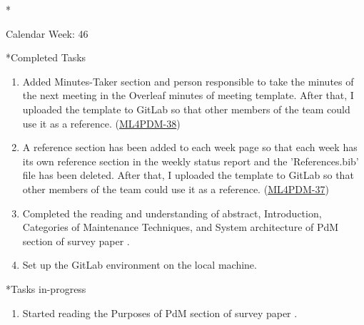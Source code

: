 \documentclass[11pt,a4paper]{article}
\begin{document}
\newpage
\begin{section}*{Calendar Week: 46 \hfill \date{13 November, 2020}}
 \begin{refsection}
     \begin{subsection}*{Completed Tasks}
         \begin{enumerate}
             \item
                   Added Minutes-Taker section and person responsible to take the minutes of the next meeting in the Overleaf minutes of meeting template. After that, I uploaded the template to GitLab so that other members of the team could use it as a reference. (\href{https://ml4pdm.atlassian.net/browse/ML4PDM-38}{ML4PDM-38})
             \item
                   A reference section has been added to each week page so that each week has its own reference section in the weekly status report and the 'References.bib' file has been deleted. After that, I uploaded the template to GitLab so that other members of the team could use it as a reference. (\href{https://ml4pdm.atlassian.net/browse/ML4PDM-37}{ML4PDM-37})
             \item
                   Completed the reading and understanding of abstract, Introduction, Categories of Maintenance Techniques, and System architecture of PdM section of survey paper \cite{DBLP:journals/corr/abs-1912-07383}.
             \item
                   Set up the GitLab environment on the local machine.
         \end{enumerate}
     \end{subsection}

     \begin{subsection}*{Tasks in-progress}
         \begin{enumerate}
             \item
                   Started reading the Purposes of PdM section of survey paper \cite{DBLP:journals/corr/abs-1912-07383}.
         \end{enumerate}
     \end{subsection}

     \printbibliography
 \end{refsection}
\end{section}
\end{document}
